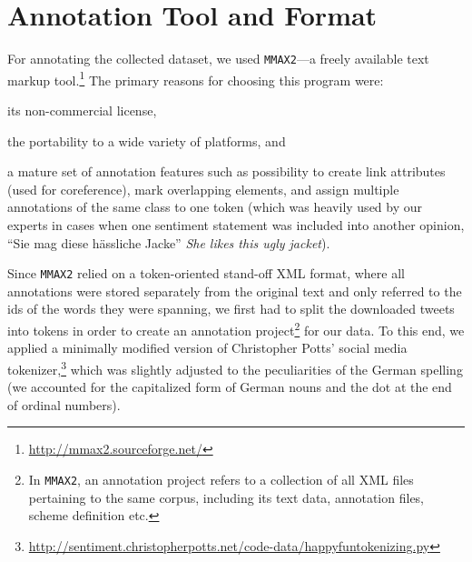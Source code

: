\section{Annotation Tool and Format}\label{subsec:snt:tformat}

For annotating the collected dataset, we used \texttt{MMAX2}---a
freely available text markup
tool.\footnote{\url{http://mmax2.sourceforge.net/}} The primary
reasons for choosing this program were:
\begin{inparaenum}[(i)]
 \item its non-commercial license,
 \item the portability to a wide variety of platforms, and
 \item a mature set of annotation features such as possibility to
   create link attributes (used for coreference), mark overlapping
   elements, and assign multiple annotations of the same class to one
   token (which was heavily used by our experts in cases when one
   sentiment statement was included into another opinion, \eg{} ``Sie
   mag diese h\"assliche Jacke'' \emph{She likes this ugly jacket}).
\end{inparaenum}

Since \texttt{MMAX2} relied on a token-oriented stand-off XML format,
where all annotations were stored separately from the original text
and only referred to the ids of the words they were spanning, we first
had to split the downloaded tweets into tokens in order to create an
annotation project\footnote{In \texttt{MMAX2}, an annotation project
  refers to a collection of all XML files pertaining to the same
  corpus, including its text data, annotation files, scheme definition
  etc.} for our data.  To this end, we applied a minimally modified
version of Christopher Potts' social media
tokenizer,\footnote{\url{http://sentiment.christopherpotts.net/code-data/happyfuntokenizing.py}}
which was slightly adjusted to the peculiarities of the German
spelling (we accounted for the capitalized form of German nouns and
the dot at the end of ordinal numbers).

